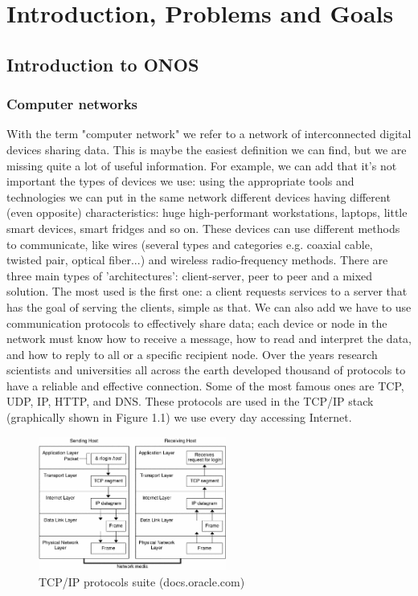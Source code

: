\chapter{Introduction, Problems and Goals}

\section{Introduction to ONOS}

\subsection{Computer networks}

With the term "computer network" we refer to a network of interconnected digital devices sharing data. This is maybe the easiest definition we can find, but we are missing quite a lot of useful information. For example, we can add that it's not important the types of devices we use: using the appropriate tools and technologies we can put in the same network different devices having different (even opposite) characteristics: huge high-performant workstations, laptops, little smart devices, smart fridges and so on. These devices can use different methods to communicate, like wires (several types and categories e.g. coaxial cable, twisted pair, optical fiber...) and wireless radio-frequency methods. There are three main types of 'architectures': client-server, peer to peer and a mixed solution. The most used is the first one: a client requests services to a server that has the goal of serving the clients, simple as that. We can also add we have to use communication protocols to effectively share data; each device or node in the network must know how to receive a message, how to read and interpret the data, and how to reply to all or a specific recipient node. Over the years research scientists and universities all across the earth developed thousand of protocols to have a reliable and effective connection. Some of the most famous ones are TCP, UDP, IP, HTTP, and DNS. These protocols are used in the TCP/IP stack (graphically shown in Figure 1.1) we use every day accessing Internet. 

\begin{figure}
\caption{TCP/IP protocols suite (docs.oracle.com)}
\label{fig:tcpipstack}
\includegraphics[width=0.55\textwidth]{resources/Chapter-1/tcpipstack.jpeg}
\end{figure}

